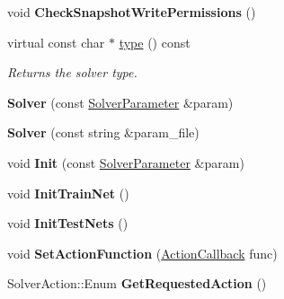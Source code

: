 \begin{DoxyCompactItemize}
void {\bfseries Check\+Snapshot\+Write\+Permissions} ()
\item 
\mbox{\label{classcaffe_1_1_solver_a733bef9a2e7dea29f52ed46a922d96f7}} 
virtual const char $\ast$ \mbox{\hyperlink{classcaffe_1_1_solver_a733bef9a2e7dea29f52ed46a922d96f7}{type}} () const
\begin{DoxyCompactList}\small\item\em Returns the solver type. \end{DoxyCompactList}\item 
\mbox{\label{classcaffe_1_1_solver_a153266a021a077d1e4b53819cf558780}} 
{\bfseries Solver} (const \mbox{\hyperlink{classcaffe_1_1_solver_parameter}{Solver\+Parameter}} \&param)
\item 
\mbox{\label{classcaffe_1_1_solver_a8dea449cb5198e44b1ad975943ec0d64}} 
{\bfseries Solver} (const string \&param\+\_\+file)
\item 
\mbox{\label{classcaffe_1_1_solver_abf3071597032efde211e5b48cdcb99c5}} 
void {\bfseries Init} (const \mbox{\hyperlink{classcaffe_1_1_solver_parameter}{Solver\+Parameter}} \&param)
\item 
\mbox{\label{classcaffe_1_1_solver_a12e2bc3f5747c5e983f11d6c1dbe1256}} 
void {\bfseries Init\+Train\+Net} ()
\item 
\mbox{\label{classcaffe_1_1_solver_a41e4eff217da272aa8dbc6f0d3bdd289}} 
void {\bfseries Init\+Test\+Nets} ()
\item 
\mbox{\label{classcaffe_1_1_solver_a4a90f66f516b986e873211fcbe340348}} 
void {\bfseries Set\+Action\+Function} (\mbox{\hyperlink{namespacecaffe_a117e25cc445c0d716517761a0fbc6daf}{Action\+Callback}} func)
\item 
\mbox{\label{classcaffe_1_1_solver_af31b33df3dd3ea3b689839c8cb2ed29e}} 
Solver\+Action\+::\+Enum {\bfseries Get\+Requested\+Action} ()
\item 
\mbox{\label{classcaffe_1_1_solver_a9a1da92f4fa0149464937c37f6a3ae77}} 

\end{DoxyCompactItemize}
